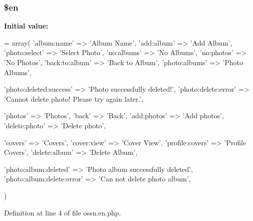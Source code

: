 \subsubsection[{\texorpdfstring{\$en}{$en}}]{\setlength{\rightskip}{0pt plus 5cm}\$en}\hypertarget{components_2_ossn_photos_2locale_2ossn_8en_8php_a48abc714dfb71c8fffa83cf49f452115}{}\label{components_2_ossn_photos_2locale_2ossn_8en_8php_a48abc714dfb71c8fffa83cf49f452115}
{\bfseries Initial value\+:}
\begin{DoxyCode}
= array(
    \textcolor{stringliteral}{'album:name'} => \textcolor{stringliteral}{'Album Name'},
    \textcolor{stringliteral}{'add:album'} => \textcolor{stringliteral}{'Add Album'},
    \textcolor{stringliteral}{'photo:select'} => \textcolor{stringliteral}{'Select Photo'},
    \textcolor{stringliteral}{'no:albums'} => \textcolor{stringliteral}{'No Albums'},
    \textcolor{stringliteral}{'no:photos'} => \textcolor{stringliteral}{'No Photos'},
    \textcolor{stringliteral}{'back:to:album'} => \textcolor{stringliteral}{'Back to Album'},
    \textcolor{stringliteral}{'photo:albums'} => \textcolor{stringliteral}{'Photo Albums'},
    
    \textcolor{stringliteral}{'photo:deleted:success'} => \textcolor{stringliteral}{'Photo successfully deleted!'},
    \textcolor{stringliteral}{'photo:delete:error'} => \textcolor{stringliteral}{'Cannot delete photo! Please try again later.'},
    
    \textcolor{stringliteral}{'photos'} => \textcolor{stringliteral}{'Photos'},
    \textcolor{stringliteral}{'back'} => \textcolor{stringliteral}{'Back'},
    \textcolor{stringliteral}{'add:photos'} => \textcolor{stringliteral}{'Add photos'},
    \textcolor{stringliteral}{'delete:photo'} => \textcolor{stringliteral}{'Delete photo'},
    
    \textcolor{stringliteral}{'covers'} => \textcolor{stringliteral}{'Covers'},
    \textcolor{stringliteral}{'cover:view'} => \textcolor{stringliteral}{'Cover View'},
    \textcolor{stringliteral}{'profile:covers'} => \textcolor{stringliteral}{'Profile Covers'},
    \textcolor{stringliteral}{'delete:album'} => \textcolor{stringliteral}{'Delete Album'},
    
    \textcolor{stringliteral}{'photo:album:deleted'} => \textcolor{stringliteral}{'Photo album successfully deleted'},
    \textcolor{stringliteral}{'photo:album:delete:error'} => \textcolor{stringliteral}{'Can not delete photo album'},
    

)
\end{DoxyCode}


Definition at line 4 of file ossn.\+en.\+php.

